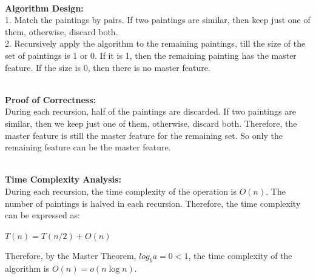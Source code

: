 \begin{parts}
\begin{subparts}
    \begin{solution}
        \\
        \textbf{Algorithm Design:} \\
        1. Match the paintings by pairs. If two paintings are similar, then keep just one of them, otherwise, discard both. \\
        2. Recursively apply the algorithm to the remaining paintings, till the size of the set of paintings is 1 or 0. If it is 1, then the remaining painting has the master feature. If the size is 0, then there is no master feature. \\
    \end{solution}
    \begin{solution}
        \\
        \textbf{Proof of Correctness:} \\
        During each recursion, half of the paintings are discarded. If two paintings are similar, then we keep just one of them, otherwise, discard both. Therefore, the master feature is still the master feature
        for the remaining set. So only the remaining feature can be the master feature.
    \end{solution}
    \begin{solution}
        \\
        \textbf{Time Complexity Analysis:} \\
        During each recursion, the time complexity of the operation is $O(n)$. The number of paintings is halved in each recursion. Therefore, the time complexity can be expressed as: \\
        \begin{center}
            $T(n) = T(n/2) + O(n)$
        \end{center}
        Therefore, by the Master Theorem, $log_b a = 0 < 1$, the time complexity of the algorithm is $O(n) = o(n\log n)$.
    \end{solution}
\end{subparts}

\end{parts}